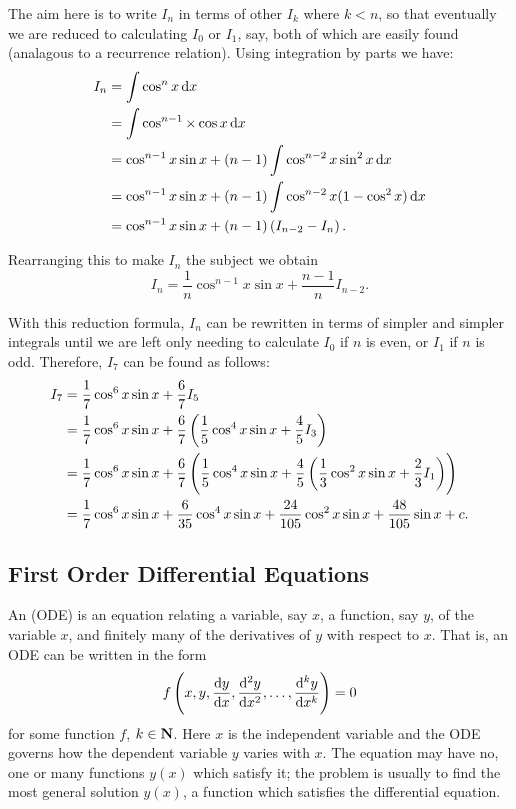 \begin{solution}
The aim here is to write $I_n$ in terms of other $I_k$ where $k<n$, so that eventually we are reduced to calculating $I_0$ or $I_1$, say, both of which are easily found (analagous to a recurrence relation). Using integration by parts we have:
\begin{align*}
I_n&=\int\cos^n x\dd{x}\\
&=\int\cos^{n-1}\times\cos x\dd{x}\\
&=\cos^{n-1}x\sin x+(n-1)\int\cos^{n-2}x\sin^2 x\dd{x}\\
&=\cos^{n-1}x\sin x+(n-1)\int\cos^{n-2}x(1-\cos^2 x)\dd{x}\\
&=\cos^{n-1}x\sin x+(n-1)\left(I_{n-2}-I_n\right).
\end{align*}

Rearranging this to make $I_n$ the subject we obtain
\[I_n=\frac{1}{n}\cos^{n-1}x\sin x+\frac{n-1}{n}I_{n-2}.\]

With this reduction formula, $I_n$ can be rewritten in terms of simpler and simpler integrals until we are left only needing to calculate $I_0$ if $n$ is even, or $I_1$ if $n$ is odd. Therefore, $I_7$ can be found as follows:
\begin{align*}
I_7&=\frac{1}{7}\cos^6x\sin x+\frac{6}{7}I_5\\
&=\frac{1}{7}\cos^6x\sin x+\frac{6}{7}\left(\frac{1}{5}\cos^4x\sin x+\frac{4}{5}I_3\right)\\
&=\frac{1}{7}\cos^6x\sin x+\frac{6}{7}\left(\frac{1}{5}\cos^4x\sin x+\frac{4}{5}\left(\frac{1}{3}\cos^2x\sin x+\frac{2}{3}I_1\right)\right)\\
&=\frac{1}{7}\cos^6x\sin x+\frac{6}{35}\cos^4x\sin x+\frac{24}{105}\cos^2x\sin x+\frac{48}{105}\sin x+c.
\end{align*}
\end{solution}

\subsection{First Order Differential Equations}
An  (ODE) is an equation relating a variable, say $x$, a function, say $y$, of the variable $x$, and finitely many of the derivatives of $y$ with respect to $x$. That is, an ODE can be written in the form
\[f\left(x,y,\dv{y}{x},\dv[2]{y}{x},\dots,\dv[k]{y}{x}\right)=0\]
for some function $f$, $k\in\mathbf N$. Here $x$ is the independent variable and the ODE governs how the dependent variable $y$ varies with $x$. The equation may have no, one or many functions $y(x)$ which satisfy it; the problem is usually to find the most general solution $y(x)$, a function which satisfies the differential equation.

